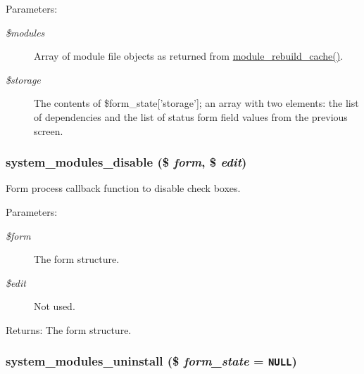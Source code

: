 \begin{Desc}
\item[Parameters:]
\begin{description}
\item[{\em \$modules}]Array of module file objects as returned from \hyperlink{module_8inc_d906a52cfba472d859805466e64a5312}{module\_\-rebuild\_\-cache()}. \item[{\em \$storage}]The contents of \$form\_\-state\mbox{[}'storage'\mbox{]}; an array with two elements: the list of dependencies and the list of status form field values from the previous screen. \end{description}
\end{Desc}
\hypertarget{group__forms_ga1c6a106e2cb1667b9aff6986c875fb1}{
\subsubsection[{system\_\-modules\_\-disable}]{\setlength{\rightskip}{0pt plus 5cm}system\_\-modules\_\-disable (\$ {\em form}, \/  \$ {\em edit})}}
\label{group__forms_ga1c6a106e2cb1667b9aff6986c875fb1}


Form process callback function to disable check boxes.

\begin{Desc}
\item[Parameters:]
\begin{description}
\item[{\em \$form}]The form structure. \item[{\em \$edit}]Not used.\end{description}
\end{Desc}
\begin{Desc}
\item[Returns:]The form structure. \end{Desc}
\hypertarget{group__forms_g6719870584aaef3fa06f2d0c2392daf1}{
\subsubsection[{system\_\-modules\_\-uninstall}]{\setlength{\rightskip}{0pt plus 5cm}system\_\-modules\_\-uninstall (\$ {\em form\_\-state} = {\tt NULL})}}
\label{group__forms_g6719870584aaef3fa06f2d0c2392daf1}


